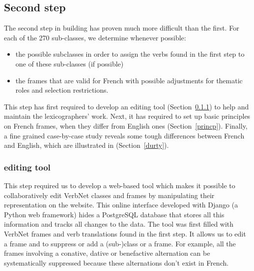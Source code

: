 

\subsection{Second step}\label{second}

The second step in building \verbenet{} has proven much more difficult than the
first. For each of the 270 \Cf{} sub-classes, we determine whenever possible:

\begin{itemize}

    \item the possible subclasses in order to assign the verbs found in the
    first step to one of these sub-classes (if possible)

    \item the frames that are valid for French with possible adjustments for
    thematic roles and selection restrictions.

\end{itemize}

This step has first required to develop an editing tool
(Section~\ref{toolquentin}) to help and maintain the lexicographers' work.
Next, it has required to set up basic principles on French frames, when they
differ from English ones (Section~\ref{princp}). Finally, a fine grained
case-by-case study reveals some tough differences between French and English,
which are illustrated in (Section~\ref{durty}).


\subsubsection{\verbenet{} editing tool}\label{toolquentin}

This step  required us to develop a web-based tool which makes it possible to
collaboratively edit VerbNet classes and frames by manipulating their
representation on the website. This online interface developed with Django (a
Python web framework) hides a PostgreSQL database that stores all this
information and tracks all changes to the data.  The tool was first filled with
VerbNet frames and verb translations found in the first step. It allows
us to edit a frame and to suppress or add a (sub-)class or a frame. For
example, all the frames involving a conative, dative or benefactive alternation
can be systematically suppressed because these alternations don't exist in
French.

